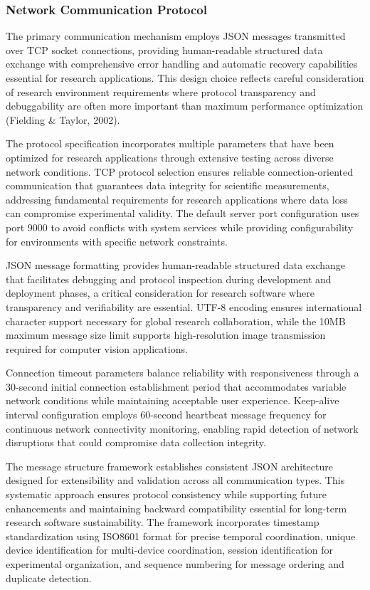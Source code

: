 \documentclass[11pt,a4paper]{article}
\begin{document}
\subsubsection{Network Communication Protocol}

The primary communication mechanism employs JSON messages transmitted over TCP socket connections, providing
human-readable structured data exchange with comprehensive error handling and automatic recovery capabilities essential
for research applications. This design choice reflects careful consideration of research environment requirements where
protocol transparency and debuggability are often more important than maximum performance optimization (Fielding \&
Taylor, 2002).

The protocol specification incorporates multiple parameters that have been optimized for research applications through
extensive testing across diverse network conditions. TCP protocol selection ensures reliable connection-oriented
communication that guarantees data integrity for scientific measurements, addressing fundamental requirements for
research applications where data loss can compromise experimental validity. The default server port configuration uses
port 9000 to avoid conflicts with system services while providing configurability for environments with specific network
constraints.

JSON message formatting provides human-readable structured data exchange that facilitates debugging and protocol
inspection during development and deployment phases, a critical consideration for research software where transparency
and verifiability are essential. UTF-8 encoding ensures international character support necessary for global research
collaboration, while the 10MB maximum message size limit supports high-resolution image transmission required for
computer vision applications.

Connection timeout parameters balance reliability with responsiveness through a 30-second initial connection
establishment period that accommodates variable network conditions while maintaining acceptable user experience.
Keep-alive interval configuration employs 60-second heartbeat message frequency for continuous network connectivity
monitoring, enabling rapid detection of network disruptions that could compromise data collection integrity.

The message structure framework establishes consistent JSON architecture designed for extensibility and validation
across all communication types. This systematic approach ensures protocol consistency while supporting future
enhancements and maintaining backward compatibility essential for long-term research software sustainability. The
framework incorporates timestamp standardization using ISO8601 format for precise temporal coordination, unique device
identification for multi-device coordination, session identification for experimental organization, and sequence
numbering for message ordering and duplicate detection.
\end{document}

